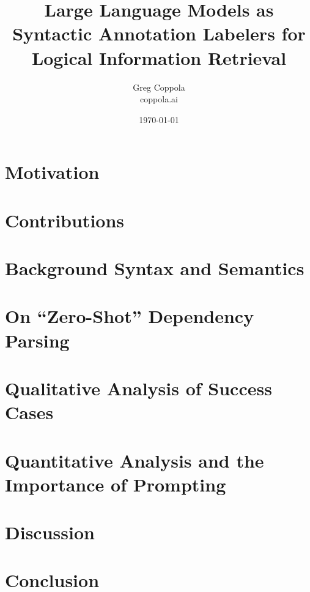 \documentclass[11pt]{article}
\title{Large Language Models as Syntactic Annotation Labelers for Logical Information Retrieval}
\author{Greg Coppola\\coppola.ai}
\date{\today}
\begin{document}
\maketitle



\section{Motivation}


\section{Contributions}


\section{ Background Syntax and Semantics}



\section{On ``Zero-Shot'' Dependency Parsing}


\section{Qualitative Analysis of Success Cases}

\section{Quantitative Analysis and the Importance of Prompting}




\section{Discussion}


\section{Conclusion}




\end{document}
